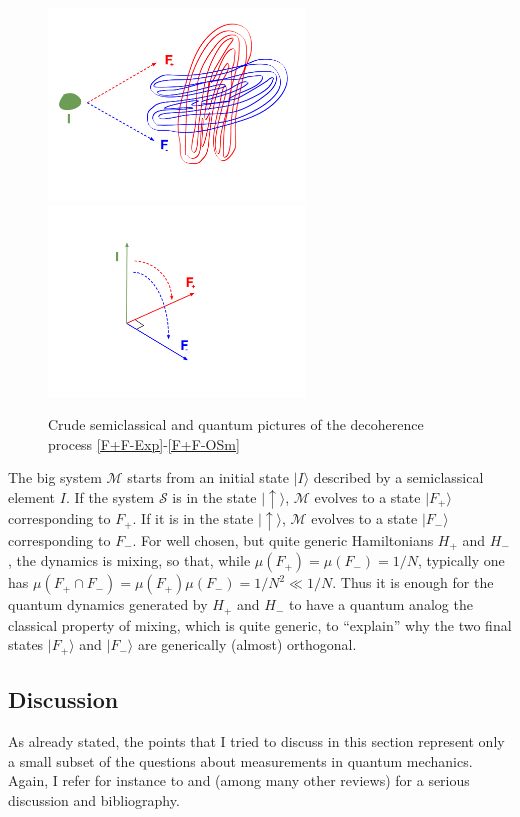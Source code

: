 \begin{figure}[h]
\begin{center}
\includegraphics[height=2in]{Mixing-2.pdf}\qquad\qquad\includegraphics[height=2in]{MixingQ.pdf}
\caption{Crude semiclassical and quantum pictures of the decoherence process \ref{F+F-Exp}-\ref{F+F-OSm}}
\label{fFFMixing}
\end{center}
\end{figure}

The big system $\mathcal{M}$ starts from an initial state $|I\rangle$  described by a semiclassical element $I$. 
If the system $\mathcal{S}$ is in the state $|\uparrow\rangle$, $\mathcal{M}$ evolves to a state $| F_+\rangle$ corresponding to $F_+$.
If it is in the state $|\uparrow\rangle$, $\mathcal{M}$ evolves to a state $| F_-\rangle$ corresponding to $F_-$.
For well chosen, but quite generic Hamiltonians $H_+$ and $H_-$, the dynamics is mixing, so that, while $\mu(F_+)=\mu(F_-)=1/N$, typically one has $\mu(F_+\cap F_-)=\mu(F_+) \mu(F_-) = 1/N^2\ll 1/N$.
Thus it is enough for the quantum dynamics generated by $H_+$ and $H_-$ to have a quantum analog the classical property of mixing, which is quite generic, to ``explain'' why the two final states $|F_+\rangle$ and $|F_-\rangle$ are generically (almost) orthogonal.

\subsection{Discussion}
As already stated, the points that I tried to discuss in this section represent only a small subset of the questions about measurements in quantum mechanics. Again, I refer for instance to \cite{AlBaNi2012} and \cite{Laloe-book} (among many other reviews) for a serious discussion and bibliography.

